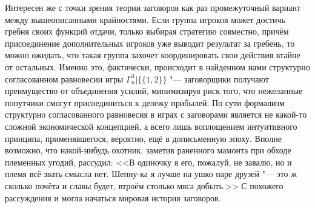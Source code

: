 Интересен же с точки зрения теории заговоров как раз промежуточный вариант между вышеописанными крайностями. Если группа игроков может достичь гребня своих функций отдачи, только выбирая стратегию совместно, причём присоединение дополнительных игроков уже выводит результат за гребень, то можно ожидать, что такая группа захочет координировать свои действия втайне от остальных. Именно это, фактически, происходит в найденном нами структурно согласованном равновесии игры $\Gamma^3_n | \{\{1,2\}\}$ "--- заговорщики получают преимущество от объединения усилий, минимизируя риск того, что нежеланные попутчики смогут присоединиться к дележу прибылей. По сути формализм структурно согласованного равновесия в играх с заговорами является не какой-то сложной экономической концепцией, а всего лишь воплощением интуитивного принципа, применявшегося, вероятно, ещё в дописьменную эпоху. Вполне возможно, что накой-нибудь охотник, заметив раненного мамонта при обходе племенных угодий, рассудил: <<В одиночку я его, пожалуй, не завалю, но и племя всё звать смысла нет. Шепну-ка я лучше на ушко паре друзей "--- это ж сколько почёта и славы будет, втроём столько мяса добыть.>> С похожего рассуждения и могла начаться мировая история заговоров.

\FloatBarrier
